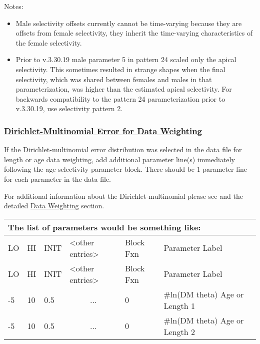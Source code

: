 Notes:
\begin{itemize}
	\item Male selectivity offsets currently cannot be time-varying because they are offsets from female selectivity, they inherit the time-varying characteristics of the female selectivity.
    \item Prior to v.3.30.19 male parameter 5 in pattern 24 scaled only the apical selectivity. This sometimes resulted in strange shapes when the final selectivity, which was shared between females and males in that parameterization, was higher than the estimated apical selectivity. For backwards compatibility to the pattern 24 parameterization prior to v.3.30.19, use selectivity pattern 2.
\end{itemize}

\hypertarget{Dirichletparameter}{}
\subsubsection[Dirichlet-Multinomial Error for Data Weighting]{\protect\hyperlink{Dirichletparameter}{Dirichlet-Multinomial Error for Data Weighting}}
If the Dirichlet-multinomial error distribution was selected in the data file for length or age data weighting, add additional parameter line(s) immediately following the age selectivity parameter block. There should be 1 parameter line for each parameter in the data file.

For additional information about the Dirichlet-multinomial please see \citet{thorson-model-based-2017} and the detailed \hyperlink{DataWeight}{Data Weighting} section.

	
\begin{longtable}{p{1cm} p{1cm} p{1cm} p{2.9cm} p{1.8cm} p{6.5cm}}
	\multicolumn{6}{l}{The list of parameters would be something like:} \\
	\hline
	LO \Tstrut & HI & INIT & <other entries> & Block Fxn & Parameter Label \Bstrut\\
	\hline
	\endfirsthead
	
	\hline
	LO \Tstrut & HI & INIT & <other entries> & Block Fxn & Parameter Label \Bstrut\\
	\hline
	\endhead

	-5 & 10 & 0.5 & \multicolumn{1}{c}{...} & 0 & \#ln(DM theta) Age or Length 1 \Tstrut\\
	-5 & 10 & 0.5 & \multicolumn{1}{c}{...} & 0 & \#ln(DM theta) Age or Length 2 \Bstrut\\
	\hline
\end{longtable}

